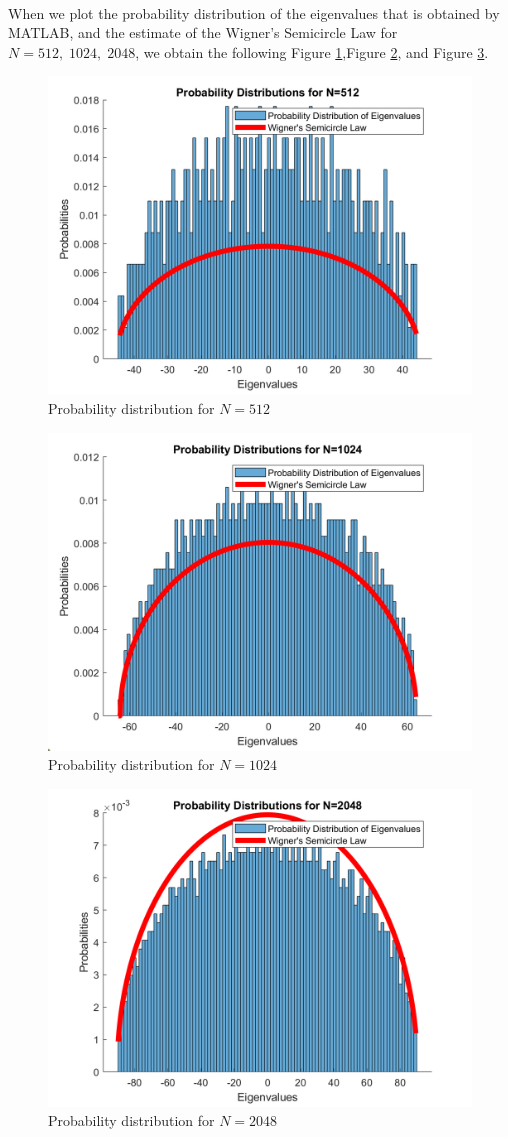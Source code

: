 \documentclass[letterpaper,12pt]{article}
\begin{document}
\paragraph{} When we plot the probability distribution of the eigenvalues that is obtained by MATLAB, and the estimate of the Wigner's Semicircle Law for $N = 512, \;1024, \; 2048$, we obtain the following Figure \ref{fig:n512},Figure \ref{fig:n1024}, and Figure \ref{fig:n2048}.

\begin{figure}[H] 
   \centering \includegraphics[width=0.7\columnwidth]{figures/n512.png}           
                  \caption{Probability distribution for $N=512$}                
                     \label{fig:n512}
   \end{figure}

\begin{figure}[H] 
   \centering \includegraphics[width=0.7\columnwidth]{figures/n1024.png}           
                  \caption{Probability distribution for $N=1024$}                
                     \label{fig:n1024}
   \end{figure}

\begin{figure}[H] 
   \centering \includegraphics[width=0.7\columnwidth]{figures/n2048.png}           
                  \caption{Probability distribution for $N=2048$}                
                     \label{fig:n2048}
   \end{figure}
\end{document}
